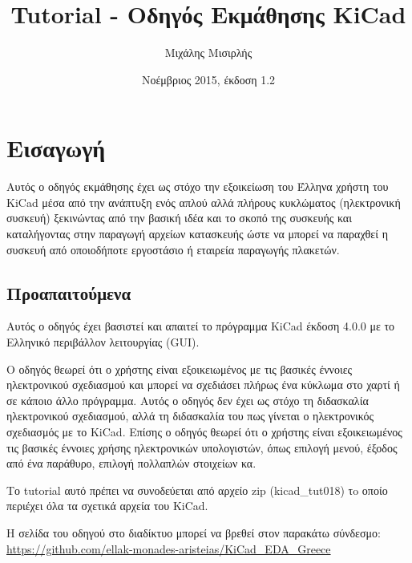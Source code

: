 \documentclass[a4paper]{article}
\title{Tutorial - Οδηγός Εκμάθησης KiCad}
\author{Μιχάλης Μισιρλής}
\date{Νοέμβριος 2015, έκδοση 1.2}
\begin{document}
\maketitle

\pagebreak
\tableofcontents
\pagebreak

\newpage
\section{Εισαγωγή}
Αυτός ο οδηγός εκμάθησης έχει ως στόχο την εξοικείωση του Έλληνα χρήστη του \textenglish{KiCad} μέσα από την ανάπτυξη ενός απλού αλλά πλήρους κυκλώματος (ηλεκτρονική συσκευή) ξεκινώντας από την βασική ιδέα και το σκοπό της συσκευής και καταλήγοντας στην παραγωγή αρχείων κατασκευής ώστε να μπορεί να παραχθεί η συσκευή από οποιοδήποτε εργοστάσιο ή εταιρεία παραγωγής πλακετών.

\subsection{Προαπαιτούμενα}
\label{sec:prereq}
Αυτός ο οδηγός έχει βασιστεί και απαιτεί το πρόγραμμα \textenglish{KiCad} έκδοση 4.0.0 με το Ελληνικό περιβάλλον λειτουργίας (GUI).

Ο οδηγός θεωρεί ότι ο χρήστης είναι εξοικειωμένος με τις βασικές έννοιες ηλεκτρονικού σχεδιασμού και μπορεί να σχεδιάσει πλήρως ένα κύκλωμα στο χαρτί ή σε κάποιο άλλο πρόγραμμα. Αυτός ο οδηγός δεν έχει ως στόχο τη διδασκαλία ηλεκτρονικού σχεδιασμού, αλλά τη διδασκαλία του πως γίνεται ο ηλεκτρονικός σχεδιασμός με το \textenglish{KiCad}. Επίσης ο οδηγός θεωρεί ότι ο χρήστης είναι εξοικειωμένος τις βασικές έννοιες χρήσης ηλεκτρονικών υπολογιστών, όπως επιλογή μενού, έξοδος από ένα παράθυρο, επιλογή πολλαπλών στοιχείων κα.


Το tutorial αυτό πρέπει να συνοδεύεται από αρχείο zip (kicad\_tut018) τo οποίο περιέχει όλα τα σχετικά αρχεία του \textenglish{KiCad}. 

Η σελίδα του οδηγού στο διαδίκτυο μπορεί να βρεθεί στον παρακάτω σύνδεσμο:\\
\href{https://github.com/ellak-monades-aristeias/KiCad\_EDA\_Greece}{https://github.com/ellak-monades-aristeias/KiCad\_EDA\_Greece}
\end{document}
